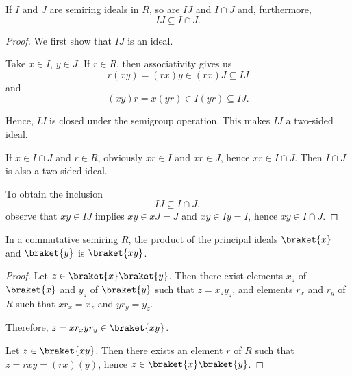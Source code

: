 \begin{proposition}\label{thm:product_of_semigroup_ideals_is_in_intersection}
  If \( I \) and \( J \) are semiring ideals in \( R \), so are \( IJ \) and \( I \cap J \) and, furthermore,
  \begin{equation*}
    IJ \subseteq I \cap J.
  \end{equation*}
\end{proposition}
\begin{proof}
  We first show that \( IJ \) is an ideal.

  Take \( x \in I \), \( y \in J \). If \( r \in R \), then associativity gives us
  \begin{equation*}
    r(xy) = (rx)y \in (rx)J \subseteq IJ
  \end{equation*}
  and
  \begin{equation*}
    (xy)r = x(yr) \in I(yr) \subseteq IJ.
  \end{equation*}

  Hence, \( IJ \) is closed under the semigroup operation. This makes \( IJ \) a two-sided ideal.

  If \( x \in I \cap J \) and \( r \in R \), obviously \( xr \in I \) and \( xr \in J \), hence \( xr \in I \cap J \). Then \( I \cap J \) is also a two-sided ideal.

  To obtain the inclusion
  \begin{equation*}
    IJ \subseteq I \cap J,
  \end{equation*}
  observe that \( xy \in IJ \) implies \( xy \in xJ = J \) and \( xy \in Iy = I \), hence \( xy \in I \cap J \).
\end{proof}

\begin{proposition}\label{thm:product_of_principal_ideals}
  In a \hyperref[def:semiring/commutative]{commutative semiring} \( R \), the product of the principal ideals \( \braket{x} \) and \( \braket{y} \) is \( \braket{xy} \).
\end{proposition}
\begin{proof}
  \SufficiencySubProof Let \( z \in \braket{x} \braket{y} \). Then there exist elements \( x_z \) of \( \braket{x} \) and \( y_z \) of \( \braket{y} \) such that \( z = x_z y_z \), and elements \( r_x \) and \( r_y \) of \( R \) such that \( x r_x = x_z \) and \( y r_y = y_z \).

  Therefore, \( z = x r_x y r_y \in \braket{xy} \).

  \NecessitySubProof Let \( z \in \braket{xy} \). Then there exists an element \( r \) of \( R \) such that \( z = rxy = (rx)(y) \), hence \( z \in \braket{x} \braket{y} \).
\end{proof}
